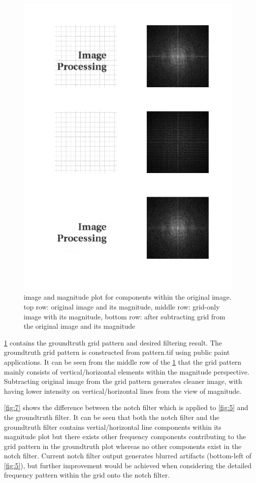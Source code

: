 \documentclass[extendedabs]{bmvc2k}
\begin{document}
\begin{figure}[h]
    \centering
    \includegraphics[width=\linewidth]{hw3_4_2}
    \caption{image and magnitude plot for components within the original image. top row: original image
    and its magnitude, middle row: grid-only image with its magnitude, bottom row: after
    subtracting grid from the original image and its magnitude}
    \label{fig:6}
\end{figure}

\figurename{\ref{fig:6}} contains the groundtruth grid pattern and desired filtering result.
The groundtruth grid pattern is constructed from pattern.tif using public paint applications.
It can be seen from the middle row of the \figurename{\ref{fig:6}} that the grid pattern mainly consists
of vertical/horizontal elements within the magnitude perspective. Subtracting original image from the
grid pattern generates cleaner image, with having lower intensity on vertical/horizontal lines from
the view of magnitude.

\figurename{\ref{fig:7}} shows the difference between the notch filter which is applied to 
\figurename{\ref{fig:5}} and the groundtruth filter. It can be seen that both the notch
filter and the groundtruth filter contains vertial/horizontal line components within its
magnitude plot but there exists other frequency components contributing to the grid pattern
in the groundtruth plot whereas no other components exist in the notch filter.
Current notch filter output generates blurred artifacts (bottom-left of \figurename{\ref{fig:5}}), but further 
improvement would be achieved when considering the detailed frequency pattern 
within the grid onto the notch filter.
\end{document}
